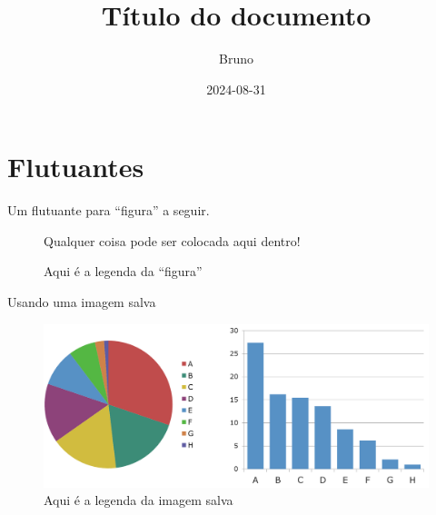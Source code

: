 \documentclass[dsc,male,12pt,a4paper]{ita}
\title{Título do documento}
\author{Bruno}
\date{2024-08-31}
\begin{document}
\frontmatter
\maketitle

\tableofcontents

\mainmatter
\chapter{Flutuantes}

\lipsum[3-5]
Um flutuante para ``figura'' a seguir.\par
\begin{figure}[tbp]
	Qualquer coisa pode ser colocada aqui dentro!\\
	\lipsum[1]
	\caption{Aqui é a legenda da ``figura''}
\end{figure}\par
\lipsum[6-7]

Usando uma imagem salva
\begin{figure}[tbp]
	\centering
	\includegraphics[width=\textwidth]{./imagem.png}
	\caption{Aqui é a legenda da imagem salva}
\end{figure}
\end{document}
